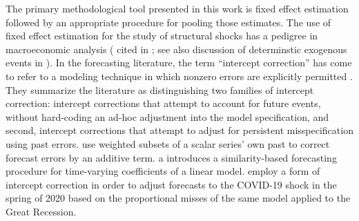 \documentclass[11pt]{article}
\theoremstyle{definition}
\begin{document}

The primary methodological tool presented in this work is fixed effect estimation followed by an appropriate procedure for pooling those estimates.  The use of fixed effect estimation for the study of structural shocks has a pedigree in macroeconomic analysis (\citet{romer1989does} cited in \citet{kilian2017structural}; see also discussion of determinstic exogenous events in \citet{engle2001good}).  In the forecasting literature, the term ``intercept correction'' has come to refer to a modeling technique in which nonzero errors are explicitly permitted \citep{hendry1994theory, clements1998forecasting}.  They summarize the literature as distinguishing two families of intercept correction: intercept corrections that attempt to account for future events, without hard-coding an ad-hoc adjustment into the model specification, and second, intercept corrections that attempt to adjust for persistent misspecification using past errors.  \citet{guerron2017macroeconomic} use weighted subsets of a scalar series' own past to correct forecast errors by an additive term. \citet{dendramis2020similarity} a introduces a similarity-based forecasting procedure for time-varying coefficients of a linear model. \citet{foroni2022forecasting} employ a form of intercept correction in order to adjust forecasts to the COVID-19 shock in the spring of 2020 based on the proportional misses of the same model applied to the Great Recession.
\end{document}
